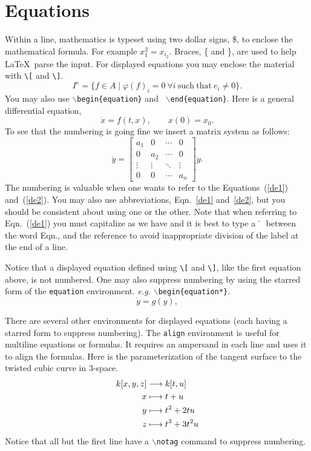\section{Equations}
\label{s:equations}
Within a line, mathematics is typeset using two dollar signs, \$, to
enclose the mathematical formula. For example $x_1^2 = x_{i_2}$.
Braces, \{ and \}, are used to help \LaTeX\ parse the input.
For displayed equations you may enclose the material with \verb+\[+
and \verb+\]+.
\[
I^e=\{f\in A\mid
\varphi(f)_i =0\ \forall i \mathrm{\ such\ that\ }
e_i\not=0\}.
\]
You may also use {\tt $\backslash$begin\{equation\}} and  {\tt
  $\backslash$end\{equation\}}. 
Here is a general differential equation,
\begin{equation}
\dot{x} = f(t,x),\qquad x(0)= x_0. \label{de1}
\end{equation}
To see that the numbering is going fine we insert a matrix system as
follows:
\begin{equation}
\dot{y} =
\begin{bmatrix}
a_1 & 0 & \cdots & 0 \\
0 & a_2 & \cdots & 0 \\
\vdots & \vdots & \ddots & \vdots \\
0 & 0 & \cdots & a_n
\end{bmatrix}
y.
\label{de2}
\end{equation}
The numbering is valuable when one wants to refer to the
Equations~(\ref{de1}) and~(\ref{de2}). You may also use abbreviations,
Eqn.~\eqref{de1} and~\eqref{de2}, but you should be consistent
about using one or the other.
Note that when referring to
Eqn.~(\ref{de1}) you must capitalize as we have
and it is best to type 
 a $\tilde{\phantom{x}}$ between the word Eqn., and the reference to avoid
inappropriate division of the label at the end of a line.

Notice that a displayed equation defined using  \verb+\[+ and
\verb+\]+, like the first equation above,  is not numbered. 
One may also  suppress numbering by using the starred form of the
{\tt equation} environment.
{\em e.g.}  {\tt $\backslash$begin\{equation*\}}.
\begin{equation*}
\dot{y} = g(y),
\end{equation*}

There are several other environments for displayed equations (each
having a starred form to suppress numbering). The {\tt align}
environment is useful for multiline equations or formulas.  It  requires an
ampersand in each line and uses it to align the formulas.
Here is the parameterization of the tangent surface to the twisted
cubic curve in 3-space.
\begin{align}
 k[x,y,z] &\longrightarrow k[t,u] \\
x & \longmapsto t + u \notag \\     %
y & \longmapsto t^2 + 2tu \notag \\ %
z & \longmapsto t^3 + 3t^2u \notag
\end{align}
Notice that all but the first line have a {\tt $\backslash$notag}
command to suppress numbering. 


